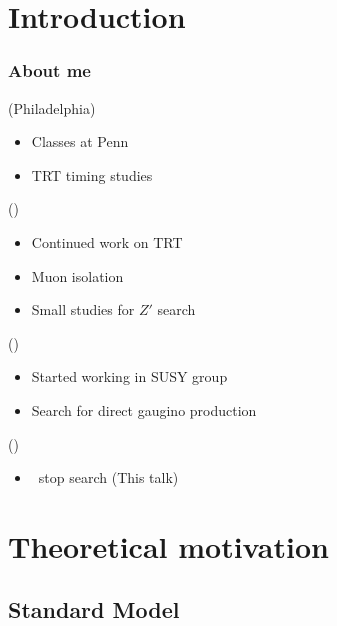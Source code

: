 \documentclass[10pt, svgnames]{beamer}
\begin{document}
\section{Introduction}

\begin{frame}
  \frametitle{About me}
  \begin{description}[0ex]
    \item[2008-2010] (Philadelphia) \\
      \begin{itemize}
        \item Classes at Penn
        \item TRT timing studies
      \end{itemize}
    \item[2010-2012] (\cern) \\
      \begin{itemize}
        \item Continued work on TRT
        \item Muon isolation
        \item Small studies for $Z'$ search
      \end{itemize}
    \item[2012-2013] (\cern) \\
      \begin{itemize}
        \item Started working in SUSY group
        \item Search for direct gaugino production
      \end{itemize}
    \item[2013-2015] (\cern) \\
      \begin{itemize}
        \item \BMINUSL\ stop search (This talk)
      \end{itemize}
  \end{description}
\end{frame}

\section{Theoretical motivation}
\subsection{Standard Model}
\end{document}
